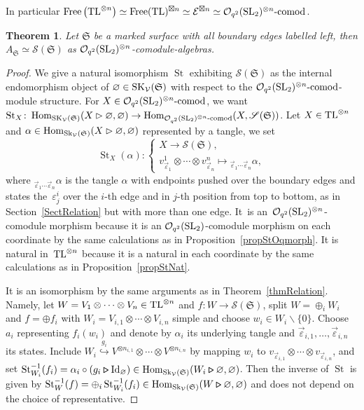 \documentclass[pdftex]{sigma}%
\numberwithin{equation}{section}
\newtheorem{Theorem}{Theorem}[section]
\newcommand{\St}{\operatorname{St}}
\newcommand{\Free}{\operatorname{Free}}
\newcommand{\Hom}{\operatorname{Hom}}
\newcommand{\bmrhd}{\bm{\triangleright}}
\newcommand{\Oq}{\mathcal{O}_{q^2}({\rm SL}_2)}
\begin{document}
In particular $\Free\big({\rm TL}^{\otimes n}\big)\simeq \Free({\rm TL})^{\boxtimes n}\simeq \mathcal{E}^{\boxtimes n} \simeq \Oq^{\otimes n}\text{-}{\rm comod}$.
\begin{Theorem}\label{thmRelationMulti}
Let $\mathfrak{S}$ be a marked surface with all boundary edges labelled left, then $A_\mathfrak{S}\simeq \mathscr{S}(\mathfrak{S})$ as $\Oq^{\otimes n}$-comodule-algebras.
\end{Theorem}
\begin{proof}
We give a natural isomorphism $\St$ exhibiting $\mathscr{S}(\mathfrak{S})$ as the internal endomorphism object of $\varnothing\in {\rm SK}_\mathcal{V}(\mathfrak{S})$ with respect to the $\Oq^{\otimes n}\text{-}{\rm comod}$-module structure. For $X \in \Oq^{\otimes n}\text{-}{\rm comod}$, we want ${\rm St}_X\colon \Hom_{{\rm SK}_\mathcal{V}(\mathfrak{S})}(X \rhd \varnothing,\varnothing) \to \Hom_{\Oq^{\otimes n}\text{-}{\rm comod}}(X,\mathscr{S}(\mathfrak{S}))$. Let $X \in {\rm TL}^{\otimes n}$ and $\alpha \in \Hom_{{\rm Sk}_\mathcal{V}(\mathfrak{S})}(X \rhd \varnothing,\varnothing)$ represented by a tangle, we set
\[
\St_X(\alpha)\colon \begin{cases} X \to \mathscr{S}(\mathfrak{S}),
\\
v_{\vec{\varepsilon}_1}^1 \otimes \cdots \otimes v_{\vec{\varepsilon}_n}^n \mapsto {}_{\vec{\varepsilon}_1\cdots \vec{\varepsilon}_n}\alpha, \end{cases}
\]
where ${}_{\vec{\varepsilon}_1\cdots \vec{\varepsilon}_n}\alpha$ is the tangle $\alpha$ with endpoints pushed over the boundary edges and states the~$\varepsilon_j^i$ over the $i$-th edge and in $j$-th position from top to bottom, as in Section~\ref{SectRelation} but with more than one edge.
It~is an~$\Oq^{\otimes n}$-comodule morphism because it is an $\Oq$-comodule morphism on each coordinate by the same calculations as in Proposition~\ref{propStOqmorph}. It is natural in~${\rm TL}^{\otimes n}$ because it is a natural in each coordinate by the same calculations as in Proposition~\ref{propStNat}.

It is an isomorphism by the same arguments as in Theorem~\ref{thmRelation}. Namely, let $W = V_1\otimes \cdots \otimes V_n \in {\rm TL}^{\otimes n}$ and $f\colon W \to \mathscr{S}(\mathfrak{S})$, split $W = \oplus_i W_i$ and $f = \oplus f_i$ with $W_i = V_{i,1}\otimes\cdots\otimes V_{i,n}$ simple and choose $w_i \in W_i\smallsetminus\{0\}$. Choose $a_i$ representing $f_i(w_i)$ and denote by $\alpha_i$ its underlying tangle and $\vec{\varepsilon}_{i,1},\dots,\vec{\varepsilon}_{i,n}$ its states. Include $W_i \overset{g_i}\hookrightarrow V^{\otimes n_{i,1}}\otimes\cdots\otimes V^{\otimes n_{i,n}}$ by mapping $w_i$ to $v_{\vec{\varepsilon}_{i,1}}\otimes\cdots\otimes v_{\vec{\varepsilon}_{i,n}}$, and set ${\rm St}_{W_i}^{-1}(f_i) = \alpha_i \circ (g_i \bmrhd {\rm Id}_\varnothing) \in \Hom_{{\rm Sk}_\mathcal{V}(\mathfrak{S})}(W_i\bmrhd \varnothing,\varnothing)$. Then the inverse of $\St$ is given by $\St_W^{-1}(f) = \oplus_i \St_{W_i}^{-1}(f_i) \in \Hom_{{\rm Sk}_\mathcal{V}(\mathfrak{S})}(W\bmrhd \varnothing,\varnothing)$ and does not depend on the choice of representative.


\end{proof}
\end{document}
